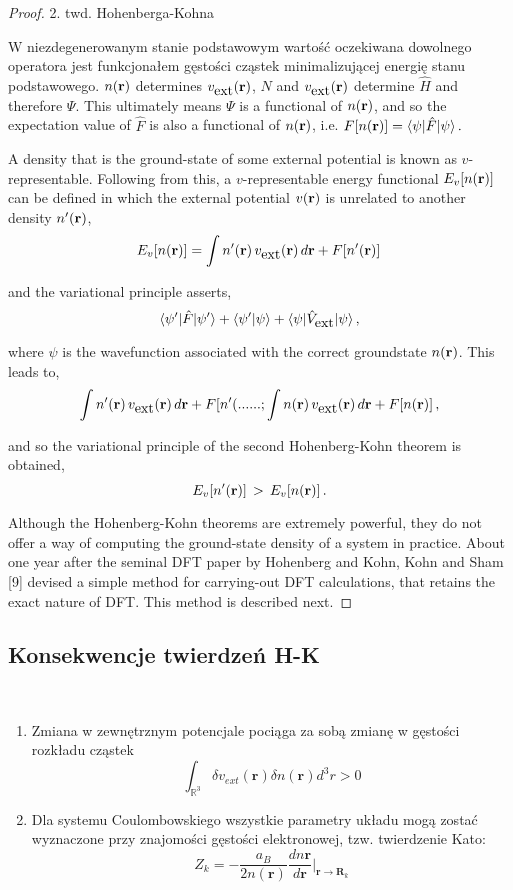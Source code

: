 \begin{proof}
2. twd. Hohenberga-Kohna

W niezdegenerowanym stanie podstawowym wartość oczekiwana dowolnego
operatora jest funkcjonałem gęstości cząstek minimalizującej energię
stanu podstawowego. $n({\bf r})$ determines $v_{\hbox{ext}}({\bf r})$,
$N$ and $v_{\hbox{ext}}({\bf r})$ determine $\hat{H}$ and therefore
$\Psi$. This ultimately means $\Psi$ is a functional of $n({\bf r})$,
and so the expectation value of $\hat{F}$ is also a functional of
$n({\bf r})$, i.e. ${\displaystyle F[n({\bf r})]=\langle\psi\vert\hat{F}\vert\psi\rangle\,.}$

A density that is the ground-state of some external potential is known
as $v$-representable. Following from this, a $v$-representable energy
functional $E_{v}[n({\bf r})]$ can be defined in which the external
potential $v({\bf r})$ is unrelated to another density $n'({\bf r})$,
\[
E_{v}[n({\bf r})]=\int n'({\bf r})\,v_{\hbox{ext}}({\bf r})\,d{\bf r}+F[n'({\bf r})]\,
\]


and the variational principle asserts, 
\[
{\displaystyle \langle\psi'\vert\hat{F}\vert\psi'\rangle+\langle\psi'\vert\psi\rangle+\langle\psi\vert\hat{V}_{\hbox{ext}}\vert\psi\rangle\thinspace,}
\]
 

where $\psi$ is the wavefunction associated with the correct groundstate
$n({\bf r})$. This leads to, 
\[
{\displaystyle \int n'({\bf r})\,v_{\hbox{ext}}({\bf r})\,d{\bf r}+F[n'(......;\int n({\bf r})\,v_{\hbox{ext}}({\bf r})\,d{\bf r}+F[n({\bf r})]\,,}
\]


and so the variational principle of the second Hohenberg-Kohn theorem
is obtained, 
\[
\ensuremath{{\displaystyle E_{v}[n'({\bf r})]\,>\,E_{v}[n({\bf r})]\,.}}
\]


Although the Hohenberg-Kohn theorems are extremely powerful, they
do not offer a way of computing the ground-state density of a system
in practice. About one year after the seminal DFT paper by Hohenberg
and Kohn, Kohn and Sham {[}9{]} devised a simple method for carrying-out
DFT calculations, that retains the exact nature of DFT. This method
is described next. 
\end{proof}

\subsection{Konsekwencje twierdzeń H-K}
~\\
\begin{enumerate}
	\item Zmiana w zewnętrznym potencjale pociąga za sobą zmianę w gęstości rozkładu cząstek
	$$ \int_{\mathbb{R}^3} \delta v_{ext}\left(\boldsymbol{r}\right) \delta n\left(\boldsymbol{r}\right) d^3r > 0 $$
	\item Dla systemu Coulombowskiego wszystkie parametry układu mogą zostać wyznaczone przy znajomości gęstości elektronowej, tzw. twierdzenie Kato:
	$$ Z_k = - \frac{a_B}{2 n\left(\boldsymbol{r}\right)} \frac{dn\boldsymbol{r}}{d\boldsymbol{r}} \vert_{\boldsymbol{r} \to \boldsymbol{R}_k}$$
\end{enumerate}


